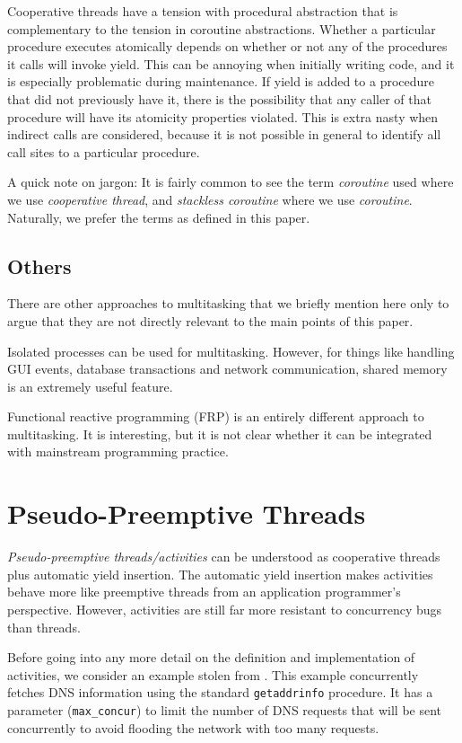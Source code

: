 \documentclass[10pt,preprint]{sigplanconf}
\begin{document}
Cooperative threads have a tension with procedural abstraction that is complementary to the tension in coroutine abstractions.
Whether a particular procedure executes atomically depends on whether or not any of the procedures it calls will invoke yield.
This can be annoying when initially writing code, and it is especially problematic during maintenance.
If yield is added to a procedure that did not previously have it, there is the possibility that any caller of that procedure will have its atomicity properties violated.
This is extra nasty when indirect calls are considered, because it is not possible in general to identify all call sites to a particular procedure.

A quick note on jargon: It is fairly common to see the term \emph{coroutine} used where we use \emph{cooperative thread}, and \emph{stackless coroutine} where we use \emph{coroutine}.
Naturally, we prefer the terms as defined in this paper.

\subsection{Others}

There are other approaches to multitasking that we briefly mention here only to argue that they are not directly relevant to the main points of this paper.

Isolated processes can be used for multitasking.
However, for things like handling GUI events, database transactions and network communication, shared memory is an extremely useful feature.

Functional reactive programming (FRP) is an entirely different approach to multitasking.
It is interesting, but it is not clear whether it can be integrated with mainstream programming practice.

\section{Pseudo-Preemptive Threads}

\emph{Pseudo-preemptive threads\slash activities} can be understood as cooperative threads plus automatic yield insertion.
The automatic yield insertion makes activities behave more like preemptive threads from an application programmer's perspective.
However, activities are still far more resistant to concurrency bugs than threads.

Before going into any more detail on the definition and implementation of activities, we consider an example stolen from \cite{Krohn2007}.
This example concurrently fetches DNS information using the standard \texttt{getaddrinfo} procedure.
It has a parameter (\texttt{max\_concur}) to limit the number of DNS requests that will be sent concurrently to avoid flooding the network with too many requests.
\end{document}
